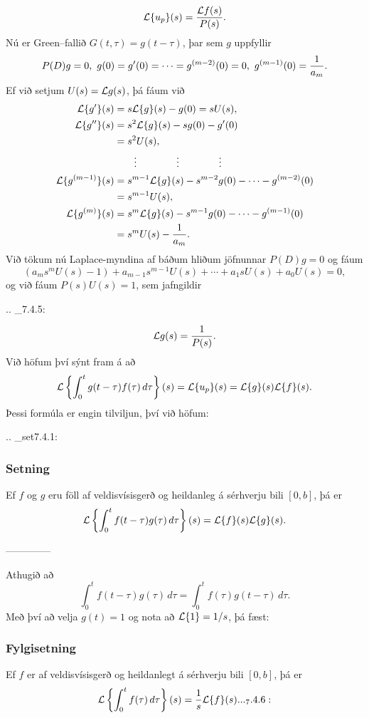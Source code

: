 \begin{equation*}
{\cal L}\{u_p\}(s)=\dfrac {{\cal L} f(s)}{P(s)}.
\end{equation*}
Nú er Green--fallið $G(t,\tau)=g(t-\tau)$, þar sem $g$ uppfyllir
$$
P(D)g=0, \  g(0)=g\dash(0)=\cdots=g^{(m-2)}(0)=0, \ 
g^{(m-1)}(0)=\dfrac 1{a_m}.  
$$ 
Ef við setjum  $U(s)={\cal L} g(s)$, þá fáum við
\begin{align*}
{\cal L}\{g{\sp{\prime}}\}(s) &= s{\cal L}\{g\}(s)-g(0)=sU(s),\\
{\cal L}\{g{\sp{\prime\prime}}\}(s) &= s^2{\cal L}\{g\}(s)-sg(0)-g{\sp{\prime}}(0)\\
&=s^2U(s),\\
&\qquad \vdots\qquad\qquad\vdots\qquad\qquad \vdots\\
{\cal L}\{g^{(m-1)}\}(s) &=
s^{m-1}{\cal L}\{g\}(s)-s^{m-2}g(0)-\cdots-g^{(m-2)}(0)\\
&=s^{m-1}U(s),\\
{\cal L}\{g^{(m)}\}(s) &=
s^m{\cal L}\{g\}(s)-s^{m-1}g(0)-\cdots-g^{(m-1)}(0)\\
&=s^mU(s)-\dfrac 1{a_m}.
\end{align*}
Við tökum nú Laplace-myndina af báðum hliðum jöfnunnar $P(D)g=0$ og fáum
$$ (a_ms^mU(s)-1)+a_{m-1}s^{m-1}U(s)+\cdots+a_1sU(s)+a_0U(s)=0, $$
og við fáum $P(s)U(s)=1$, sem jafngildir

.. _7.4.5:

\begin{equation*}
{\cal L} g(s)=\dfrac 1{P(s)}.
\end{equation*}
Við höfum því sýnt fram á að 
$$
{\cal L}\left\{\int_0^tg(t-\tau)f(\tau)\, d\tau\right\}(s)= {\cal L}\{u_p\}(s)=
{\cal L}\{g\}(s){\cal L}\{f\}(s).
$$
Þessi formúla er engin tilviljun, því við höfum:


.. _set7.4.1:

\subsubsection{Setning}  Ef $f$ og $g$ eru föll af veldisvísisgerð
og heildanleg á sérhverju bili $[0,b]$, þá er
 $${\cal L}\left\{\int_0^tf(t-\tau)g(\tau)\, d\tau\right\}(s)=
{\cal L}\{f\}(s){\cal L}\{g\}(s).
 $$


--------------



Athugið að 
 $$\int_0^t f(t-\tau)g(\tau) \, d\tau=
\int_0^t f(\tau)g(t-\tau) \, d\tau.
 $$
Með því að velja $g(t)=1$ og nota að ${\cal L}\{1\}=1/s$, þá fæst:

\subsubsection{Fylgisetning} Ef $f$ er  af veldisvísisgerð og heildanlegt á sérhverju
bili $[0,b]$, þá er
 \begin{equation*}\L\left\{\int_0^t f(\tau) \, d\tau\right\}(s) = \dfrac 1s
\L\{f\}(s).


.. _7.4.6:

 \end{equation*}


